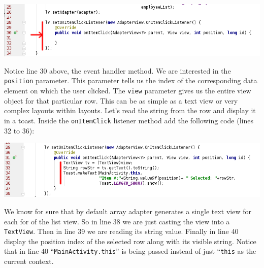 \begin{center}
	\includegraphics[scale=0.4]{chapters/ch10/images/28}
\end{center}

Notice line 30 above, the event handler method. We are interested in the \texttt{position} parameter. This parameter tells us the index of the corresponding data element on which the user clicked. The \texttt{view} parameter gives us the entire view object for that particular row. This can be as simple as a text view or very complex layouts within layouts. Let's read the string from the row and display it in a toast. Inside the \texttt{onItemClick} listener method add the following code (lines 32 to 36):

\begin{center}
	\includegraphics[scale=0.4]{chapters/ch10/images/29}
\end{center}

We know for sure that by default array adapter generates a single text view for each for of the list view. So in line 38 we are just casting the view into a \texttt{TextView}. Then in line 39 we are reading its string value. Finally in line 40 display the position index of the selected row along with its visible string. Notice that in line 40 ``\texttt{MainActivity.this}'' is being passed instead of just ``\texttt{this} as the current context.


